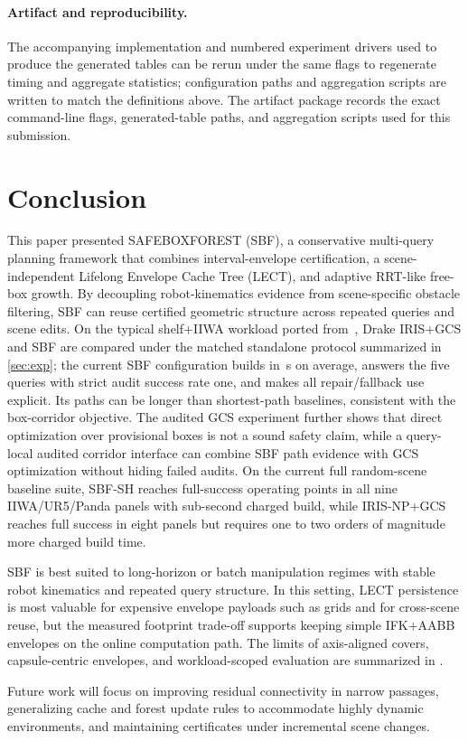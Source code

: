 \documentclass[journal]{IEEEtran}
\DeclareRobustCommand{\textsc}[1]{\textnormal{\MakeUppercase{#1}}}
\newcommand{\sbf}{\textsc{SBF}}
\begin{document}
\paragraph{Artifact and reproducibility.}
The accompanying implementation and numbered experiment drivers used to produce
the generated tables can be rerun under the same flags to regenerate timing and
aggregate statistics; configuration paths and aggregation scripts are written to
match the definitions above. The artifact package records the exact command-line
flags, generated-table paths, and aggregation scripts used for this submission.

\section{Conclusion}\label{sec:conclusion}

This paper presented \textsc{SafeBoxForest} (\sbf{}), a conservative
multi-query planning framework that combines interval-envelope certification,
a scene-independent Lifelong Envelope Cache Tree (LECT), and adaptive RRT-like
free-box growth. By decoupling robot-kinematics evidence from scene-specific
obstacle filtering, SBF can reuse certified geometric structure across repeated
queries and scene edits. On the typical shelf+IIWA workload ported
from~\cite{marcucci2023motion}, Drake IRIS+GCS and SBF are compared under the
matched standalone protocol summarized in \cref{sec:exp}; the current SBF
configuration builds in \TroSbfBuildMean\,s on average, answers the five queries
with strict audit success rate one, and makes all repair/fallback use explicit.
Its paths can be longer than shortest-path baselines, consistent with the
box-corridor objective. The audited GCS experiment further shows that direct
optimization over provisional boxes is not a sound safety claim, while a
query-local audited corridor interface can combine SBF path evidence with GCS
optimization without hiding failed audits. On the current full random-scene
baseline suite, SBF-SH reaches full-success operating points in all nine
IIWA/UR5/Panda panels with sub-second charged build, while IRIS-NP+GCS reaches
full success in eight panels but requires one to two orders of magnitude more
charged build time.

\sbf{} is best suited to long-horizon or batch manipulation regimes with stable
robot kinematics and repeated query structure. In this setting, LECT
persistence is most valuable for expensive envelope payloads such as grids and
for cross-scene reuse, but the measured footprint trade-off supports keeping
simple IFK+AABB envelopes on the online computation path. The limits of
axis-aligned covers, capsule-centric envelopes,
and workload-scoped evaluation are summarized in .

Future work will focus on improving residual connectivity in narrow passages, generalizing
cache and forest update rules to accommodate highly dynamic environments, and maintaining
certificates under incremental scene changes.



\end{document}
